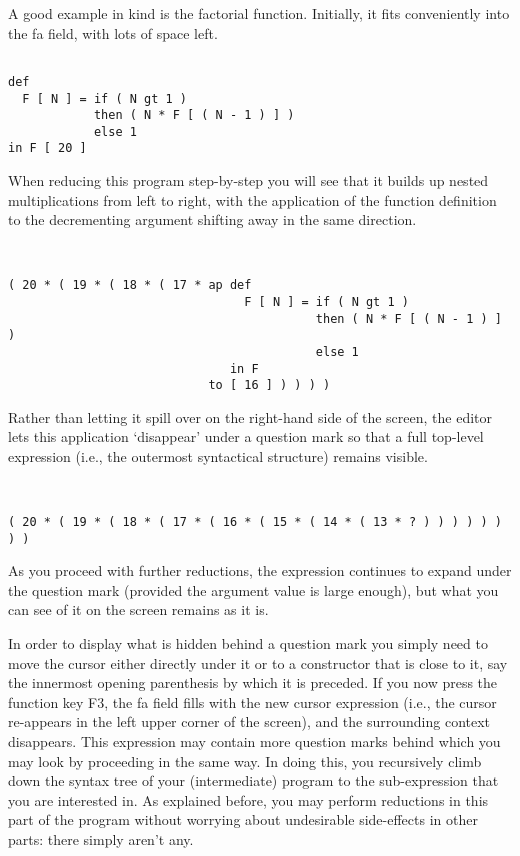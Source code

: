A good example in kind is the {\mys factorial function}. Initially, it
fits conveniently
into the {\sc fa} field, with lots of space left. 
\begin{verbatim}

def 
  F [ N ] = if ( N gt 1 )
            then ( N * F [ ( N - 1 ) ] )
            else 1
in F [ 20 ]

\end{verbatim}
When reducing this program step-by-step you will see that it builds up nested
multiplications from left to right, with the application of the 
function definition to the decrementing argument 
shifting away in the same direction.
\begin{verbatim}


( 20 * ( 19 * ( 18 * ( 17 * ap def 
                                 F [ N ] = if ( N gt 1 )
                                           then ( N * F [ ( N - 1 ) ] )
                                           else 1
                               in F
                            to [ 16 ] ) ) ) )

\end{verbatim}
 Rather than letting it spill over on the right-hand
side of the screen, the editor lets this application `disappear'
 under a question mark so that a full {\mys top-level expression} (i.e., the
outermost syntactical structure) remains visible.
\begin{verbatim}


( 20 * ( 19 * ( 18 * ( 17 * ( 16 * ( 15 * ( 14 * ( 13 * ? ) ) ) ) ) ) ) )

\end{verbatim}

 As you proceed with further reductions, the expression continues
 to expand under the question mark 
(provided the argument value is large enough), but 
what you can see of it on the screen remains as it is. 

In order to display what is hidden behind a question mark you simply need to
move the cursor either directly under it or to a constructor that is close to it, say
the innermost opening parenthesis by which it is preceded. If you now press the
function key F3, the {\sc fa} field fills with the new cursor expression (i.e., the cursor
re-appears in the left upper corner of the screen), and the
surrounding context disappears. This expression may contain more question marks
behind which you may look by proceeding in the same way. In doing this, you
recursively {\mys climb down} the syntax tree of your (intermediate) program to the sub-expression that you are interested in. As explained before, you may perform reductions in this part of the program
without worrying about undesirable side-effects in other parts: there simply aren't any.

